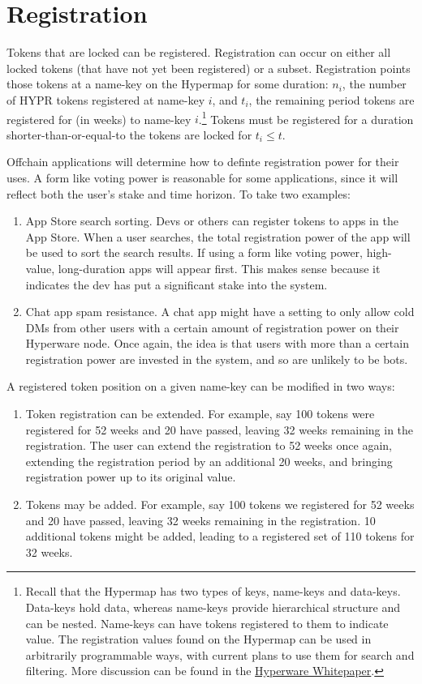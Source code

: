 \documentclass{article}
\begin{document}
\section{Registration}\label{sec:registration}

Tokens that are locked can be registered.
Registration can occur on either all locked tokens (that have not yet been registered) or a subset.
Registration points those tokens at a name-key on the Hypermap for some duration: $n_i$, the number of HYPR tokens registered at name-key $i$, and $t_i$, the remaining period tokens are registered for (in weeks) to name-key $i$.\footnote{
	Recall that the Hypermap has two types of keys, name-keys and data-keys.
	Data-keys hold data, whereas name-keys provide hierarchical structure and can be nested.
	Name-keys can have tokens registered to them to indicate value.
	The registration values found on the Hypermap can be used in arbitrarily programmable ways, with current plans to use them for search and filtering.
	More discussion can be found in the \href{https://hyperware.ai/whitepaper.pdf}{Hyperware Whitepaper}.
}
Tokens must be registered for a duration shorter-than-or-equal-to the tokens are locked for $t_i \leq t$.

Offchain applications will determine how to definte registration power for their uses.
A form like voting power is reasonable for some applications, since it will reflect both the user's stake and time horizon.
To take two examples:
\begin{enumerate}
	\item App Store search sorting.
		Devs or others can register tokens to apps in the App Store.
		When a user searches, the total registration power of the app will be used to sort the search results.
		If using a form like voting power, high-value, long-duration apps will appear first.
		This makes sense because it indicates the dev has put a significant stake into the system.
	\item Chat app spam resistance.
		A chat app might have a setting to only allow cold DMs from other users with a certain amount of registration power on their Hyperware node.
		Once again, the idea is that users with more than a certain registration power are invested in the system, and so are unlikely to be bots.
\end{enumerate}

A registered token position on a given name-key can be modified in two ways:
\begin{enumerate}
    \item Token registration can be extended.
       For example, say 100 tokens were registered for 52 weeks and 20 have passed, leaving 32 weeks remaining in the registration.
       The user can extend the registration to 52 weeks once again, extending the registration period by an additional 20 weeks, and bringing registration power up to its original value.
    \item Tokens may be added.
       For example, say 100 tokens we registered for 52 weeks and 20 have passed, leaving 32 weeks remaining in the registration.
       10 additional tokens might be added, leading to a registered set of 110 tokens for 32 weeks.
\end{enumerate}
\end{document}
